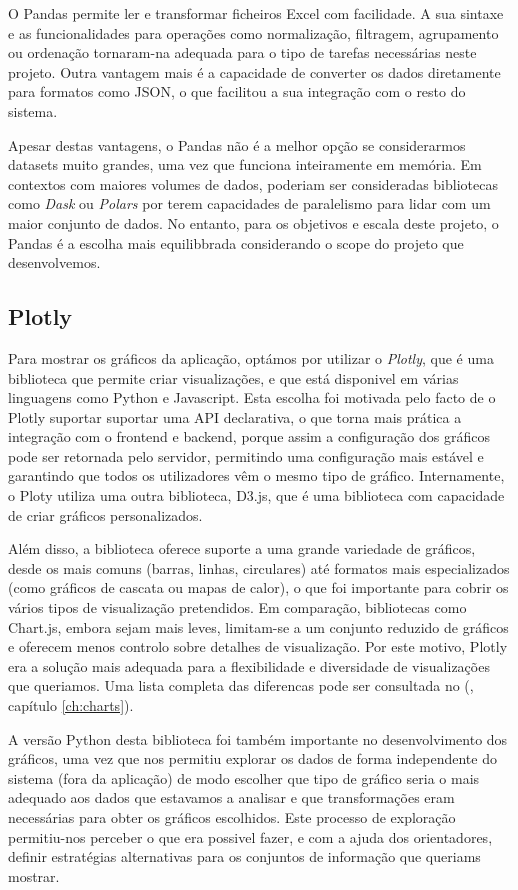 O Pandas permite ler e transformar ficheiros Excel com facilidade. A sua sintaxe e as funcionalidades para operações como normalização, filtragem, agrupamento ou ordenação tornaram-na adequada para o tipo de tarefas necessárias neste projeto.  Outra vantagem mais é a capacidade de converter os dados diretamente para formatos como JSON, o que facilitou a sua integração com o resto do sistema.

Apesar destas vantagens, o Pandas não é a melhor opção se considerarmos datasets muito grandes, uma vez que funciona inteiramente em memória. Em contextos com maiores volumes de dados, poderiam ser consideradas bibliotecas como \textit{Dask} ou \textit{Polars} por terem capacidades de paralelismo para lidar com um maior conjunto de dados. No entanto, para os objetivos e escala deste projeto, o Pandas é a escolha mais equilibbrada considerando o scope do projeto que desenvolvemos.

\subsection{Plotly}

Para mostrar os gráficos da aplicação, optámos por utilizar o \textit{Plotly}, que é uma biblioteca  que permite criar visualizações, e que está disponivel em várias linguagens como Python e Javascript. Esta escolha foi motivada pelo facto de o Plotly suportar suportar uma API declarativa, o que torna mais prática a integração com o frontend e backend, porque assim a configuração dos gráficos pode ser retornada pelo servidor, permitindo uma configuração mais estável e garantindo que todos os utilizadores vêm o mesmo tipo de gráfico. Internamente, o Ploty utiliza uma outra biblioteca, D3.js, que é uma biblioteca com capacidade de criar gráficos personalizados.

Além disso, a biblioteca oferece suporte a uma grande variedade de gráficos, desde os mais comuns (barras, linhas, circulares) até formatos mais especializados (como gráficos de cascata ou mapas de calor), o que foi importante para cobrir os vários tipos de visualização pretendidos. Em comparação, bibliotecas como Chart.js, embora sejam mais leves, limitam-se a um conjunto reduzido de gráficos e oferecem menos controlo sobre detalhes de visualização. Por este motivo, Plotly era a solução mais adequada para a flexibilidade e diversidade de visualizações que queriamos. Uma lista completa das diferencas pode ser consultada no (\cf, capítulo \ref{ch:charts}).

A versão Python desta biblioteca foi também importante no desenvolvimento dos gráficos, uma vez que nos permitiu explorar os dados de forma independente do sistema (fora da aplicação) de modo escolher que tipo de gráfico seria o mais adequado aos dados que estavamos a analisar e que transformações eram necessárias para obter os gráficos escolhidos. Este processo de exploração permitiu-nos perceber o que era possivel fazer, e com a ajuda dos orientadores, definir estratégias alternativas para os conjuntos de informação que queriams mostrar.

